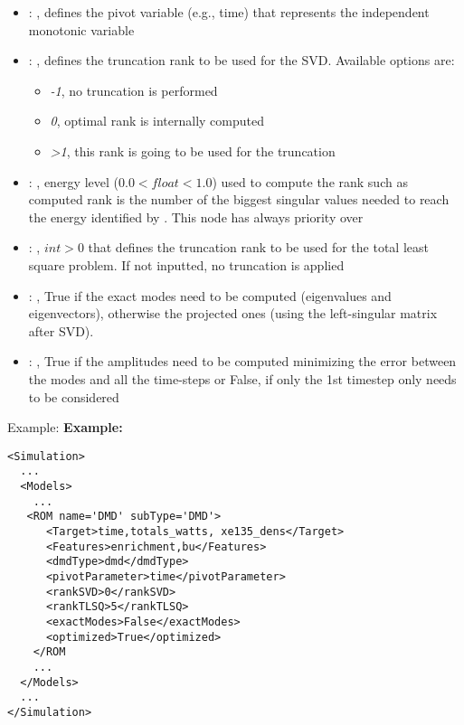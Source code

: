\begin{itemize}
    \item {}: , 
      defines the pivot variable (e.g., time) that represents the
      independent monotonic variable

    \item {}: , 
      defines the truncation rank to be used for the SVD.
      Available options are:                                                  \begin{itemize}
      \item \textit{-1}, no truncation is performed
      \item \textit{0}, optimal rank is internally computed
      \item \textit{>1}, this rank is going to be used for the truncation
      \end{itemize}

    \item {}: , 
      energy level ($0.0 < float < 1.0$) used to compute the rank such
      as computed rank is the number of the biggest singular values needed to reach the energy
      identified by                                                    . This
      node has always priority over  

    \item {}: , 
      $int > 0$ that defines the truncation rank to be used for the total
      least square problem. If not inputted, no truncation is applied

    \item {}: , 
      True if the exact modes need to be computed (eigenvalues and
      eigenvectors),   otherwise the projected ones (using the left-singular matrix after SVD).

    \item {}: , 
      True if the amplitudes need to be computed minimizing the error
      between the modes and all the time-steps or False, if only the 1st timestep only needs to be
      considered
  \end{itemize}

\hspace{24pt}
Example:
\textbf{Example:}
\begin{lstlisting}[style=XML,morekeywords={name,subType}]
<Simulation>
  ...
  <Models>
    ...
   <ROM name='DMD' subType='DMD'>
      <Target>time,totals_watts, xe135_dens</Target>
      <Features>enrichment,bu</Features>
      <dmdType>dmd</dmdType>
      <pivotParameter>time</pivotParameter>
      <rankSVD>0</rankSVD>
      <rankTLSQ>5</rankTLSQ>
      <exactModes>False</exactModes>
      <optimized>True</optimized>
    </ROM
    ...
  </Models>
  ...
</Simulation>
\end{lstlisting}

